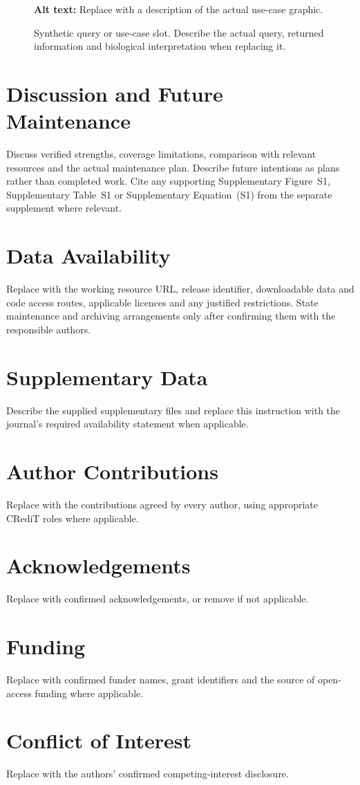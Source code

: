 \documentclass[unnumsec,webpdf,modern,large]{oup-authoring-template}
\begin{document}
\begin{figure}[t]
\centering
{}
\caption{Synthetic query or use-case slot. Describe the actual query,
returned information and biological interpretation when replacing it.}
\label{fig:database}
\par\smallskip\small\raggedright
\textbf{Alt text:} Replace with a description of the actual use-case graphic.
\end{figure}

\section{Discussion and Future Maintenance}\label{sec:discussion}
Discuss verified strengths, coverage limitations, comparison with relevant
resources and the actual maintenance plan. Describe future intentions as
plans rather than completed work. Cite any supporting Supplementary
Figure~S1, Supplementary Table~S1 or Supplementary Equation~(S1) from
the separate supplement where relevant.

\section*{Data Availability}
Replace with the working resource URL, release identifier, downloadable
data and code access routes, applicable licences and any justified
restrictions. State maintenance and archiving arrangements only after
confirming them with the responsible authors.

\section*{Supplementary Data}
Describe the supplied supplementary files and replace this instruction
with the journal's required availability statement when applicable.

\section*{Author Contributions}
Replace with the contributions agreed by every author, using appropriate
CRediT roles where applicable.

\section*{Acknowledgements}
Replace with confirmed acknowledgements, or remove if not applicable.

\section*{Funding}
Replace with confirmed funder names, grant identifiers and the source of
open-access funding where applicable.

\section*{Conflict of Interest}
Replace with the authors' confirmed competing-interest disclosure.



\end{document}
